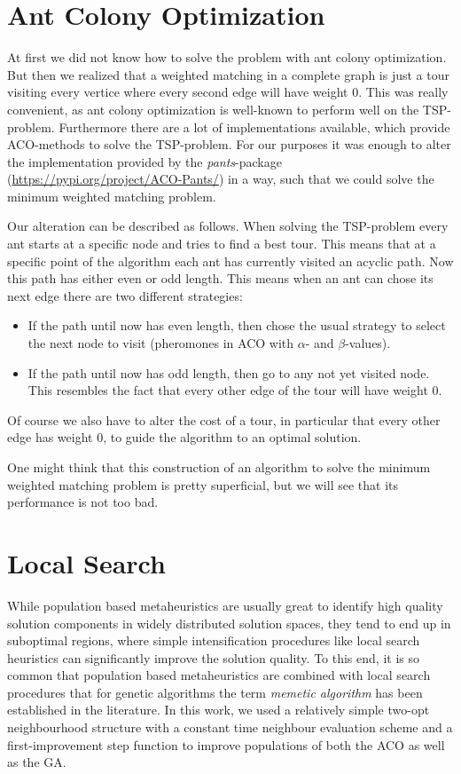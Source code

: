 \documentclass[12pt]{article}
\begin{document}
\section{Ant Colony Optimization}
At first we did not know how to solve the problem with ant colony optimization.
But then we realized that a weighted matching in a complete graph is just a tour visiting every vertice where every second edge will have weight 0.
This was really convenient, as ant colony optimization is well-known to perform well on the TSP-problem.
Furthermore there are a lot of implementations available, which provide ACO-methods to solve the TSP-problem.
For our purposes it was enough to alter the implementation provided by the \textit{pants}-package (\url{https://pypi.org/project/ACO-Pants/}) in a way, such that we could solve the minimum weighted matching problem.

Our alteration can be described as follows.
When solving the TSP-problem every ant starts at a specific node and tries to find a best tour.
This means that at a specific point of the algorithm each ant has currently visited an acyclic path.
Now this path has either even or odd length.
This means when an ant can chose its next edge there are two different strategies:
\begin{itemize}
    \item If the path until now has even length, then chose the usual strategy to select the next node to visit (pheromones in ACO with $\alpha$- and $\beta$-values).
    \item If the path until now has odd length, then go to any not yet visited node.
    This resembles the fact that every other edge of the tour will have weight 0.
\end{itemize}
Of course we also have to alter the cost of a tour, in particular that every other edge has weight 0, to guide the algorithm to an optimal solution.

One might think that this construction of an algorithm to solve the minimum weighted matching problem is pretty superficial, but we will see that its performance is not too bad.

\section{Local Search}
While population based metaheuristics are usually great to identify high quality solution components in widely distributed solution spaces, they tend to end up in suboptimal regions, where simple intensification procedures like local search heuristics can significantly improve the solution quality. To this end, it is so common that population based metaheuristics are combined with local search procedures that for genetic algorithms the term \emph{memetic algorithm} has been established in the literature. In this work, we used a relatively simple two-opt neighbourhood structure with a constant time neighbour evaluation scheme and a first-improvement step function to improve populations of both the ACO as well as the GA. 
\end{document}
